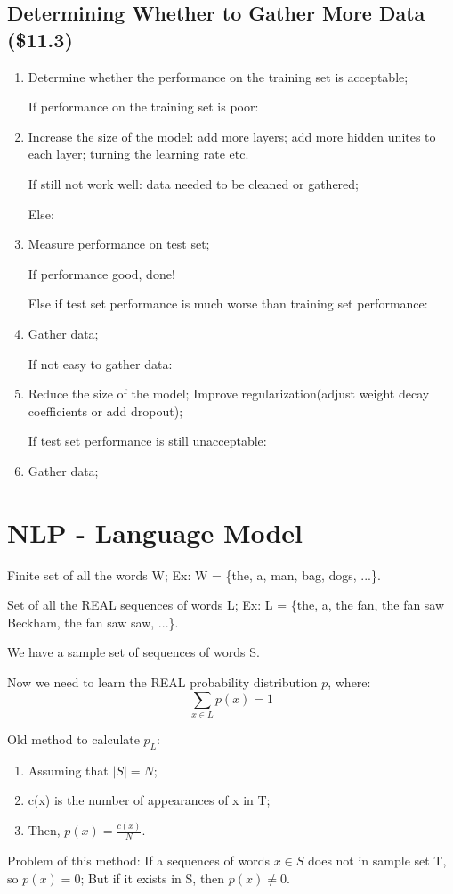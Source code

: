 \documentclass[12pt]{article}
\numberwithin{equation}{section}
\begin{document}
\subsection{Determining Whether to Gather More Data (\$11.3)}
\begin{enumerate}
	\item Determine whether the performance on the training set is acceptable; 
	
	If performance on the training set is poor:
	\item Increase the size of the model: add more layers; add more hidden unites to each layer; turning 
	the learning rate etc.
	
	If still not work well: data needed to be cleaned or gathered;
	
	Else:
	\item Measure performance on test set;
	
	If performance good, done!
	
	Else if test set performance is much worse than training set performance:
	\item Gather data;
	
	If not easy to gather data:
	\item Reduce the size of the model; Improve regularization(adjust weight decay coefficients or add dropout);
	
	If test set performance is still unacceptable:
	\item Gather data;
\end{enumerate}
\section{NLP - Language Model}
Finite set of all the words W; Ex: W = \{the, a, man, bag, dogs, ...\}.

Set of all the REAL sequences of words L; Ex: L = \{the, a, the fan, the fan saw Beckham, the fan saw saw, ...\}.

We have a sample set of sequences of words S.

Now we need to learn the REAL probability distribution $p$, where:
\[
\sum_{x \in L} p(x) = 1
\]

Old method to calculate $p_{L}$:
\begin{enumerate}
	\item Assuming that $|S| = N$;
	\item c(x) is the number of appearances of x in T;
	\item Then, $p(x)=\frac{c(x)}{N} $.
\end{enumerate}
Problem of this method: If a sequences of words $x \in S$ does not in sample set T, so $p(x)=0$;
But if it exists in S, then $p(x) \neq 0$.
\end{document}
